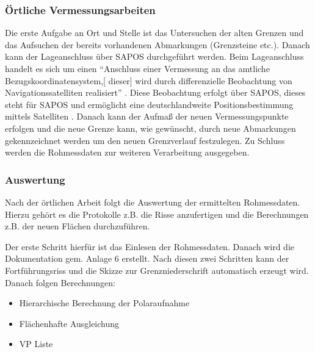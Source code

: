 \subsubsection{Örtliche Vermessungsarbeiten}

Die erste Aufgabe an Ort und Stelle ist das Untersuchen der alten Grenzen und das Aufsuchen der bereits vorhandenen Abmarkungen (Grenzsteine etc.).
Danach kann der Lageanschluss über \acs{SAPOS} durchgeführt werden. Beim Lageanschluss handelt es sich um einen "`Anschluss einer Vermessung an das amtliche Bezugskoordinatensystem,[ dieser] wird durch differenzielle Beobachtung von Navigationssatelliten realisiert"' \autocite{bier-lage}.
Diese Beobachtung erfolgt über \acs{SAPOS}, dieses steht für \acl{SAPOS} und ermöglicht eine deutschlandweite Positionsbestimmung mittels Satelliten \autocite[vgl.][2]{sapos-prospekt}. 
Danach kann der Aufmaß der neuen Vermessungspunkte  erfolgen und 
die neue Grenze kann, wie gewünscht, durch neue Abmarkungen gekennzeichnet werden um den neuen Grenzverlauf festzulegen. Zu Schluss werden die Rohmessdaten zur weiteren Verarbeitung ausgegeben.


\subsubsection{Auswertung}

Nach der örtlichen Arbeit folgt die Auswertung der ermittelten Rohmessdaten. Hierzu gehört es die Protokolle z.B. die Risse anzufertigen und die Berechnungen z.B. der neuen Flächen durchzuführen. 

Der erste Schritt hierfür ist das Einlesen der Rohmessdaten.  Danach wird die Dokumentation gem. Anlage 6 erstellt.  Nach diesen zwei Schritten kann der Fortführungsriss und die Skizze zur Grenzniederschrift automatisch erzeugt wird.  Danach folgen Berechnungen:
\begin{itemize}
	\item Hierarchische Berechnung der Polaraufnahme
	\item Flächenhafte Ausgleichung
	\item VP Liste
\end{itemize}

